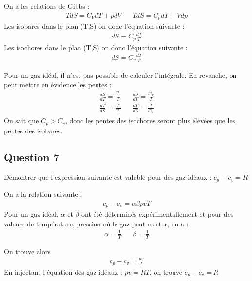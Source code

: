 \begin{tcolorbox}
    On a les relations de Gibbs : 
    \begin{align*}
        TdS = C_V dT + pdV & & TdS = C_p dT - Vdp
    \end{align*}
    Les isobares dans le plan (T,S) on donc l'équation suivante : 
    \begin{align*}
        dS = C_p \frac{dT}{T}
    \end{align*}
    Les isochores dans le plan (T,S) on donc l'équation suivante : 
    \begin{align*}
        dS = C_v \frac{dT}{T}
    \end{align*}

    Pour un gaz idéal, il n'est pas possible de calculer l'intégrale. En revanche, on peut mettre en évidence les pentes :
    \begin{align*}
        \frac{dS}{dT} = \frac{C_p}{T} & &\frac{dS}{dT} = \frac{C_v}{T}\\
        \frac{dT}{dS} = \frac{T}{C_p} & & \frac{dT}{dS} = \frac{T}{C_v}
    \end{align*}
    On sait que $C_p > C_v$, donc les pentes des isochores seront plus élevées que les pentes des isobares.
\end{tcolorbox}

\subsection*{Question 7}
Démontrer que l'expression suivante est valable pour des gaz idéaux : $c_p - c_v = R$
\begin{tcolorbox}
    On a la relation suivante : 
    \begin{align*}
        c_p - c_v = \alpha \beta p v T
    \end{align*}
    Pour un gaz idéal, $\alpha$ et $\beta$ ont été déterminés expérimentallement et pour des valeurs de température, pression où
    le gaz peut exister, on a : 
    \begin{align*}
        \alpha = \frac{1}{T} & & \beta = \frac{1}{T}
    \end{align*}

    On trouve alors
    \begin{align*}
        c_p - c_v = \frac{pv}{T}
    \end{align*}
    En injectant l'équation des gaz idéaux : $pv = RT$, on trouve $c_p - c_v = R$
\end{tcolorbox}

